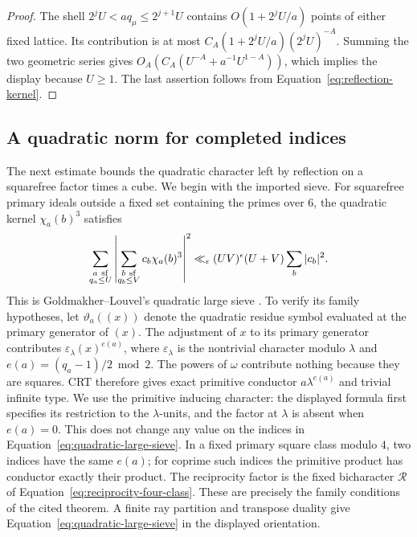 \documentclass[11pt,a4paper]{article}
\numberwithin{equation}{section}
\numberwithin{figure}{section}
\theoremstyle{definition}
\theoremstyle{remark}
\begin{document}
\begin{proof}
The shell $2^jU<a q_\mu\le2^{j+1}U$ contains
$O(1+2^jU/a)$ points of either fixed lattice.  Its contribution is at most
$C_A(1+2^jU/a)(2^jU)^{-A}$.  Summing the two geometric series gives
$O_A(C_A(U^{-A}+a^{-1}U^{1-A}))$, which implies the display because $U\ge1$.
The last assertion follows from Equation~\eqref{eq:reflection-kernel}.
\end{proof}

\subsection{A quadratic norm for completed indices}

The next estimate bounds the quadratic character left by reflection on a
squarefree factor times a cube.  We begin with the imported sieve.  For
squarefree primary ideals outside a fixed set containing the
primes over \(6\), the quadratic kernel \(\chi_a(b)^3\) satisfies
\begin{equation}\label{eq:quadratic-large-sieve}
 \sum_{\substack{a\ {\rm sf}\\q_a\le U}}
 \left|\sum_{\substack{b\ {\rm sf}\\q_b\le V}}
             c_b\chi_a(b)^3\right|^2
 \ll_\epsilon (UV)^\epsilon(U+V)\sum_b|c_b|^2.
\end{equation}
This is Goldmakher--Louvel's quadratic large sieve
\cite[Definition 1 and Theorem 1.1]{GL}.  To verify its family hypotheses,
let \(\vartheta_a((x))\) denote the quadratic residue symbol evaluated at
the primary generator of \((x)\).  The adjustment of \(x\) to its primary
generator contributes
\(\varepsilon_\lambda(x)^{e(a)}\), where \(\varepsilon_\lambda\) is the
nontrivial character modulo \(\lambda\) and
\(e(a)=(q_a-1)/2\bmod2\).  The powers of \(\omega\) contribute nothing
because they are squares.  CRT therefore gives exact primitive conductor
\(a\lambda^{e(a)}\) and trivial infinite type.  We use the primitive
inducing character: the displayed
formula first specifies its restriction to the \(\lambda\)-units, and the
factor at \(\lambda\) is absent when \(e(a)=0\).  This does not change
any value on the indices in Equation~\eqref{eq:quadratic-large-sieve}.
In a fixed primary square
class modulo \(4\), two
indices have the same \(e(a)\); for coprime such indices the primitive
product has conductor exactly their product.  The reciprocity factor is
the fixed bicharacter \(\mathcal R\) of
Equation~\eqref{eq:reciprocity-four-class}.  These are precisely the
family conditions of the cited theorem.  A finite ray partition and
transpose duality give Equation~\eqref{eq:quadratic-large-sieve} in the
displayed orientation.
\end{document}
